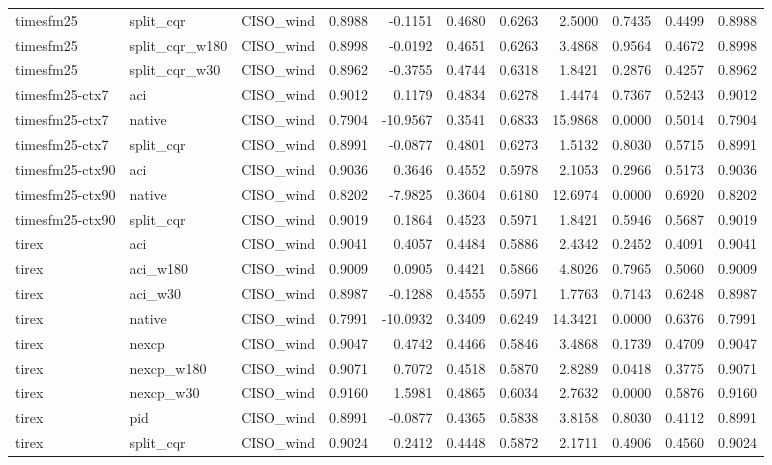 \begin{tabular}{lllrrrrrrrr}
timesfm25 & split_cqr & CISO_wind & 0.8988 & -0.1151 & 0.4680 & 0.6263 & 2.5000 & 0.7435 & 0.4499 & 0.8988 \\
timesfm25 & split_cqr_w180 & CISO_wind & 0.8998 & -0.0192 & 0.4651 & 0.6263 & 3.4868 & 0.9564 & 0.4672 & 0.8998 \\
timesfm25 & split_cqr_w30 & CISO_wind & 0.8962 & -0.3755 & 0.4744 & 0.6318 & 1.8421 & 0.2876 & 0.4257 & 0.8962 \\
timesfm25-ctx7 & aci & CISO_wind & 0.9012 & 0.1179 & 0.4834 & 0.6278 & 1.4474 & 0.7367 & 0.5243 & 0.9012 \\
timesfm25-ctx7 & native & CISO_wind & 0.7904 & -10.9567 & 0.3541 & 0.6833 & 15.9868 & 0.0000 & 0.5014 & 0.7904 \\
timesfm25-ctx7 & split_cqr & CISO_wind & 0.8991 & -0.0877 & 0.4801 & 0.6273 & 1.5132 & 0.8030 & 0.5715 & 0.8991 \\
timesfm25-ctx90 & aci & CISO_wind & 0.9036 & 0.3646 & 0.4552 & 0.5978 & 2.1053 & 0.2966 & 0.5173 & 0.9036 \\
timesfm25-ctx90 & native & CISO_wind & 0.8202 & -7.9825 & 0.3604 & 0.6180 & 12.6974 & 0.0000 & 0.6920 & 0.8202 \\
timesfm25-ctx90 & split_cqr & CISO_wind & 0.9019 & 0.1864 & 0.4523 & 0.5971 & 1.8421 & 0.5946 & 0.5687 & 0.9019 \\
tirex & aci & CISO_wind & 0.9041 & 0.4057 & 0.4484 & 0.5886 & 2.4342 & 0.2452 & 0.4091 & 0.9041 \\
tirex & aci_w180 & CISO_wind & 0.9009 & 0.0905 & 0.4421 & 0.5866 & 4.8026 & 0.7965 & 0.5060 & 0.9009 \\
tirex & aci_w30 & CISO_wind & 0.8987 & -0.1288 & 0.4555 & 0.5971 & 1.7763 & 0.7143 & 0.6248 & 0.8987 \\
tirex & native & CISO_wind & 0.7991 & -10.0932 & 0.3409 & 0.6249 & 14.3421 & 0.0000 & 0.6376 & 0.7991 \\
tirex & nexcp & CISO_wind & 0.9047 & 0.4742 & 0.4466 & 0.5846 & 3.4868 & 0.1739 & 0.4709 & 0.9047 \\
tirex & nexcp_w180 & CISO_wind & 0.9071 & 0.7072 & 0.4518 & 0.5870 & 2.8289 & 0.0418 & 0.3775 & 0.9071 \\
tirex & nexcp_w30 & CISO_wind & 0.9160 & 1.5981 & 0.4865 & 0.6034 & 2.7632 & 0.0000 & 0.5876 & 0.9160 \\
tirex & pid & CISO_wind & 0.8991 & -0.0877 & 0.4365 & 0.5838 & 3.8158 & 0.8030 & 0.4112 & 0.8991 \\
tirex & split_cqr & CISO_wind & 0.9024 & 0.2412 & 0.4448 & 0.5872 & 2.1711 & 0.4906 & 0.4560 & 0.9024 \\

\end{tabular}
